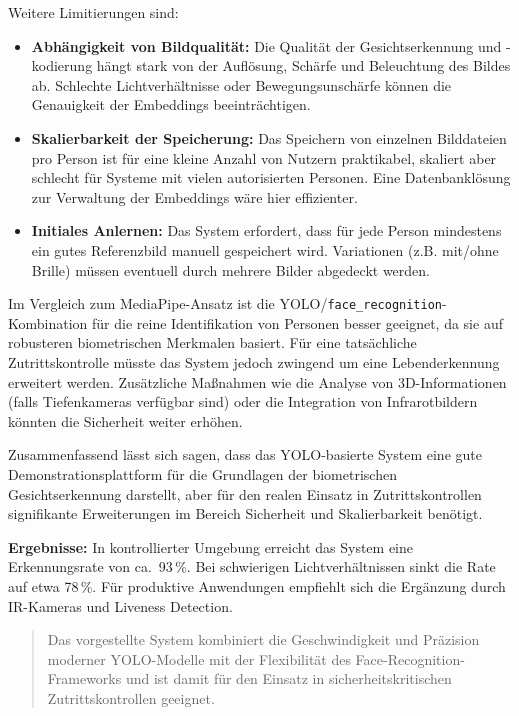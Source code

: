 Weitere Limitierungen sind:
\begin{itemize}
    \item \textbf{Abhängigkeit von Bildqualität:} Die Qualität der Gesichtserkennung und -kodierung hängt stark von der Auflösung, Schärfe und Beleuchtung des Bildes ab. Schlechte Lichtverhältnisse oder Bewegungsunschärfe können die Genauigkeit der Embeddings beeinträchtigen.
    \item \textbf{Skalierbarkeit der Speicherung:} Das Speichern von einzelnen Bilddateien pro Person ist für eine kleine Anzahl von Nutzern praktikabel, skaliert aber schlecht für Systeme mit vielen autorisierten Personen. Eine Datenbanklösung zur Verwaltung der Embeddings wäre hier effizienter.
    \item \textbf{Initiales Anlernen:} Das System erfordert, dass für jede Person mindestens ein gutes Referenzbild manuell gespeichert wird. Variationen (z.B. mit/ohne Brille) müssen eventuell durch mehrere Bilder abgedeckt werden.
\end{itemize}

Im Vergleich zum MediaPipe-Ansatz ist die YOLO/\texttt{face\_recognition}-Kombination für die reine Identifikation von Personen besser geeignet, da sie auf robusteren biometrischen Merkmalen basiert. Für eine tatsächliche Zutrittskontrolle müsste das System jedoch zwingend um eine Lebenderkennung erweitert werden. Zusätzliche Maßnahmen wie die Analyse von 3D-Informationen (falls Tiefenkameras verfügbar sind) oder die Integration von Infrarotbildern könnten die Sicherheit weiter erhöhen.

Zusammenfassend lässt sich sagen, dass das YOLO-basierte System eine gute Demonstrationsplattform für die Grundlagen der biometrischen Gesichtserkennung darstellt, aber für den realen Einsatz in Zutrittskontrollen signifikante Erweiterungen im Bereich Sicherheit und Skalierbarkeit benötigt.

\textbf{Ergebnisse:} In kontrollierter Umgebung erreicht das System eine Erkennungsrate von ca.~93\,\%. Bei schwierigen Lichtverhältnissen sinkt die Rate auf etwa 78\,\%. Für produktive Anwendungen empfiehlt sich die Ergänzung durch IR-Kameras und Liveness Detection.

\begin{quote}
Das vorgestellte System kombiniert die Geschwindigkeit und Präzision moderner YOLO-Modelle mit der Flexibilität des Face-Recognition-Frameworks und ist damit für den Einsatz in sicherheitskritischen Zutrittskontrollen geeignet.
\end{quote}


